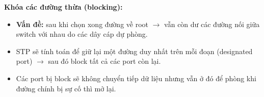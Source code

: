 \pagebreak

\noindent
\textbf{Khóa các đường thừa (blocking):}

\begin{itemize}
    \item \textbf{Vấn đề:} sau khi chọn xong đường về root $\rightarrow$ vẫn còn dư các đường nối giữa switch với nhau do các dây cáp dự phòng.
    \item[$\rightarrow$] STP sẽ tính toán để giữ lại một đường duy nhất trên mỗi đoạn (designated port) $\rightarrow$ sau đó block tất cả các port còn lại.
    \item[$\Rightarrow$] Các port bị block sẽ không chuyển tiếp dữ liệu nhưng vẫn ở đó để phòng khi đường chính bị sự cố thì mở lại.
\end{itemize}
\medskip

\pagebreak
